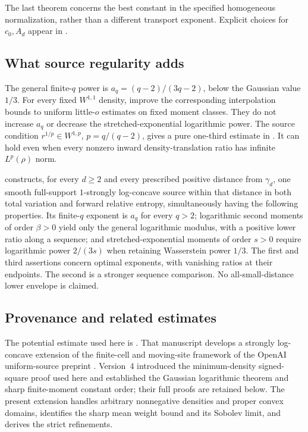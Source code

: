 \documentclass[11pt]{article}
\numberwithin{equation}{section}
\theoremstyle{remark}\newtheorem{remark}[theorem]{Remark}
\begin{document}
The last theorem concerns the best constant in the specified homogeneous normalization, rather than a different transport exponent. Explicit choices for $c_0,A_d$ appear in .

\subsection{What source regularity adds}
The general finite-$q$ power is $a_q=(q-2)/(3q-2)$, below the Gaussian value $1/3$. For every fixed $W^{1,1}$ density,  improve the corresponding interpolation bounds to uniform little-$o$ estimates on fixed moment classes. They do not increase $a_q$ or decrease the stretched-exponential logarithmic power. The source condition $r^{1/p}\in W^{1,p}$, $p=q/(q-2)$, gives a pure one-third estimate in . It can hold even when every nonzero inward density-translation ratio has infinite $L^p(\rho)$ norm.

 constructs, for every $d\ge2$ and every prescribed positive distance from $\gamma_d$, one smooth full-support $1$-strongly log-concave source within that distance in both total variation and forward relative entropy, simultaneously having the following properties. Its finite-$q$ exponent is $a_q$ for every $q>2$; logarithmic second moments of order $\beta>0$ yield only the general logarithmic modulus, with a positive lower ratio along a sequence; and stretched-exponential moments of order $s>0$ require logarithmic power $2/(3s)$ when retaining Wasserstein power $1/3$. The first and third assertions concern optimal exponents, with vanishing ratios at their endpoints. The second is a stronger sequence comparison. No all-small-distance lower envelope is claimed.

\subsection{Provenance and related estimates}
The potential estimate used here is \cite[Theorem~1.1]{ManuscriptV3}. That manuscript develops a strongly log-concave extension of the finite-cell and moving-site framework of the OpenAI uniform-source preprint \cite{OpenAI2026}. Version~4 \cite{ManuscriptV4} introduced the minimum-density signed-square proof used here and established the Gaussian logarithmic theorem and sharp finite-moment constant order; their full proofs are retained below. The present extension handles arbitrary nonnegative densities and proper convex domains, identifies the sharp mean weight bound and its Sobolev limit, and derives the strict refinements.
\end{document}
